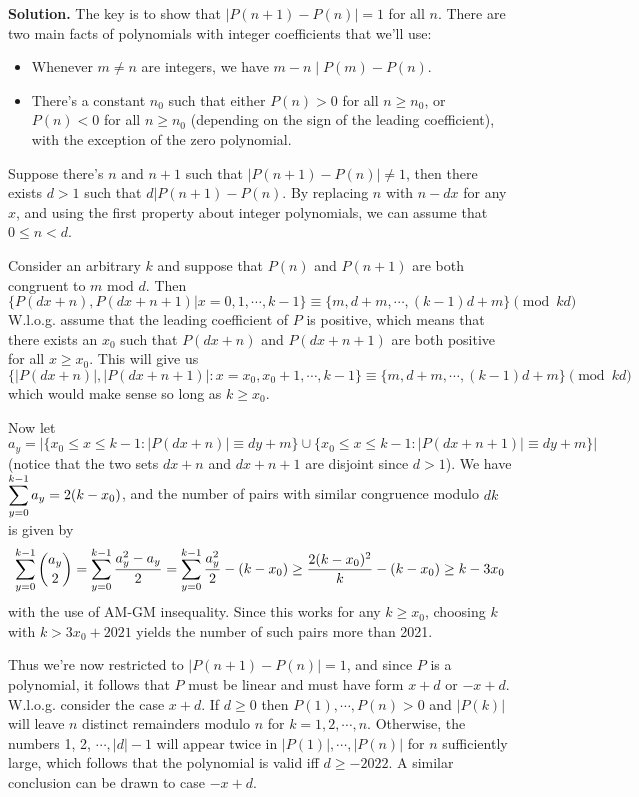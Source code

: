 \documentclass[11pt,a4paper]{article}
\begin{document}
\begin{enumerate}
	\textbf{Solution.} The key is to show that $|P(n+1)-P(n)|=1$ for all $n$. There are two main facts of polynomials with integer coefficients that we'll use: 
	\begin{itemize}
		\item Whenever $m\neq n$ are integers, we have $m-n\mid P(m)-P(n)$. 
		
		\item There's a constant $n_0$ such that either $P(n)>0$ for all $n\ge n_0$, or $P(n)<0$ for all $n\ge n_0$ (depending on the sign of the leading coefficient), with the exception of the zero polynomial. 
	\end{itemize}
	
	Suppose there's $n$ and $n+1$ such that $|P(n+1)-P(n)|\neq 1$, then there exists $d>1$ such that $d|P(n+1)-P(n)$. By replacing $n$ with $n-dx$ for any $x$, and using the first property about integer polynomials, we can assume that $0\le n<d$. 
	
	Consider an arbitrary $k$ and suppose that $P(n)$ and $P(n+1)$ are both congruent to $m$ mod $d$. 
	Then 
	\[
	\{P(dx+n), P(dx+n+1)|x=0, 1, \cdots , k-1\}\equiv \{m, d+m, \cdots , (k-1)d+m\}\pmod{kd}
	\]
	W.l.o.g. assume that the leading coefficient of $P$ is positive, which means that there exists an $x_0$ such that $P(dx+n)$ and $P(dx+n+1)$ are both positive for all $x\ge x_0$. 
	This will give us 
	\[
	\{|P(dx+n)|, |P(dx+n+1)|:x=x_0, x_0+1, \cdots , k-1\}\equiv \{m, d+m, \cdots , (k-1)d+m\}\pmod{kd}
	\]
	which would make sense so long as $k\ge x_0$. 
	
	Now let $a_y=|\{x_0\le x\le k-1: |P(dx+n)|\equiv dy+m\}\cup\{x_0\le x\le k-1: |P(dx+n+1)|\equiv dy+m\}|$ (notice that the two sets $dx+n$ and $dx+n+1$ are disjoint since $d>1$). 
	We have $\displaystyle\sum_{y=0}^{k-1} a_y = 2(k-x_0)$, and the number of pairs with similar congruence modulo $dk$ is given by 
	\[
	\displaystyle\sum_{y=0}^{k-1}\dbinom{a_y}{2} = \displaystyle\sum_{y=0}^{k-1}\frac{a_y^2-a_y}{2}
	= \displaystyle\sum_{y=0}^{k-1}\frac{a_y^2}{2}-(k-x_0)
	\ge \frac{2(k-x_0)^2}{k}-(k-x_0)
	\ge k- 3x_0
	\]
	with the use of AM-GM insequality. Since this works for any $k\ge x_0$, choosing $k$ with $k>3x_0+2021$ yields the number of such pairs more than 2021. 
	
	Thus we're now restricted to $|P(n+1)-P(n)|=1$, and since $P$ is a polynomial, it follows that $P$ must be linear and must have form $x+d$ or $-x+d$. W.l.o.g. consider the case $x+d$. If $d\ge 0$ then $P(1), \cdots , P(n)>0$ and $|P(k)|$ will leave $n$ distinct remainders modulo $n$ for $k=1, 2, \cdots , n$. Otherwise, the numbers 1, 2, $\cdots , |d|-1$ will appear twice in $|P(1)|, \cdots , |P(n)|$ for $n$ sufficiently large, which follows that the polynomial is valid iff $d\ge -2022$. A similar conclusion can be drawn to case $-x+d$. 
	

\end{enumerate}
\end{document}
